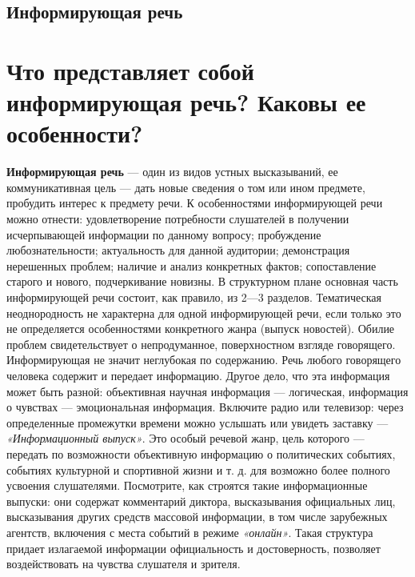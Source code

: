 \section{Информирующая речь}
\chapter{Что представляет собой информирующая речь? Каковы ее особенности?}
\textbf{Информирующая речь} — один из видов устных высказываний, ее коммуникативная цель — дать новые сведения о том или
ином предмете, пробудить интерес к предмету речи. К особенностями информирующей речи можно отнести: удовлетворение потребности слушателей в получении исчерпывающей информации по данному вопросу; пробуждение любознательности; актуальность для данной аудитории; демонстрация нерешенных проблем; наличие и анализ конкретных фактов; сопоставление старого и нового, подчеркивание новизны. В структурном плане основная часть информирующей речи состоит, как правило, из 2—3 разделов. Тематическая неоднородность не характерна для одной информирующей речи, если только это не определяется особенностями конкретного жанра (выпуск новостей). Обилие проблем свидетельствует о непродуманное, поверхностном взгляде говорящего. Информирующая не значит неглубокая по содержанию. Речь любого говорящего человека содержит и передает информацию. Другое дело, что эта информация может быть разной: объективная научная информация — логическая, информация о чувствах — эмоциональная информация. Включите радио или телевизор: через определенные промежутки времени можно услышать или увидеть заставку — \textit{«Информационный выпуск»}. Это особый речевой жанр, цель которого — передать по возможности объективную информацию о политических событиях, событиях культурной и спортивной жизни и т. д. для возможно более полного усвоения слушателями. Посмотрите, как строятся такие информационные выпуски: они содержат комментарий диктора, высказывания официальных лиц, высказывания других средств массовой информации, в том числе зарубежных агентств, включения с места событий в режиме \textit{«онлайн»}. Такая структура придает излагаемой информации официальность и достоверность, позволяет воздействовать на чувства слушателя и зрителя.
